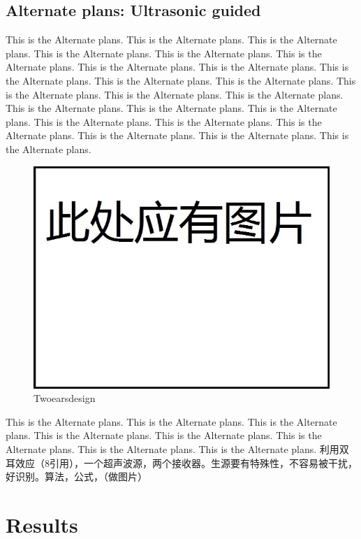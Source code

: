 \documentclass[12pt]{article}
\begin{document}
\begin{flushleft}
\subsection{Alternate plans: Ultrasonic guided}
This is the Alternate plans. This is the Alternate plans. This is the Alternate plans. This is the Alternate plans. This is the Alternate plans. This is the Alternate plans. This is the Alternate plans. This is the Alternate plans. This is the Alternate plans. This is the Alternate plans. This is the Alternate plans. This is the Alternate plans. This is the Alternate plans. This is the Alternate plans. This is the Alternate plans. This is the Alternate plans. This is the Alternate plans. This is the Alternate plans. This is the Alternate plans. This is the Alternate plans. This is the Alternate plans. This is the Alternate plans. This is the Alternate plans. 
\begin{figure}[ht!]
	\begin{center}
		\includegraphics[scale = 0.6]{twoearsdesign.jpg}
		\caption{Twoearsdesign}
	\end{center}
\end{figure}
This is the Alternate plans. This is the Alternate plans. This is the Alternate plans. This is the Alternate plans.\cite{muller1983automated} This is the Alternate plans. This is the Alternate plans. This is the Alternate plans. This is the Alternate plans. 
利用双耳效应（8引用），一个超声波源，两个接收器。生源要有特殊性，不容易被干扰，好识别。算法，公式，（做图片）

\section{Results}


\end{flushleft}
\end{document}
